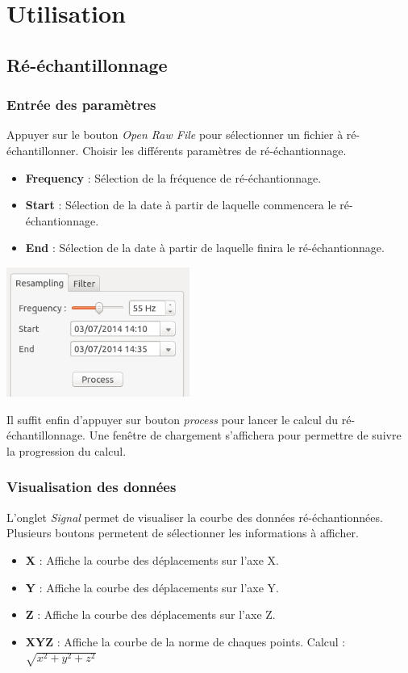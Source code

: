 \documentclass[a4paper,12pt]{article}
\begin{document}
\section{Utilisation}
\subsection{Ré-échantillonnage}
\subsubsection{Entrée des paramètres}
Appuyer sur le bouton \emph{Open Raw File} pour sélectionner un fichier à ré-échantillonner.
Choisir les différents paramètres de ré-échantionnage.
\begin{itemize}
 \item \textbf{Frequency} : Sélection de la fréquence de ré-échantionnage.
 \item \textbf{Start} : Sélection de la date à partir de laquelle commencera le ré-échantionnage.
 \item \textbf{End} : Sélection de la date à partir de laquelle finira le ré-échantionnage.
\end{itemize}
\begin{center}
 \includegraphics[width=6cm]{img/param_resampling.png}
\end{center}
Il suffit enfin d'appuyer sur bouton \emph{process} pour lancer le calcul du ré-échantillonnage. Une fenêtre de chargement s'affichera 
pour permettre de suivre la progression du calcul.


\subsubsection{Visualisation des données}
L'onglet \emph{Signal} permet de visualiser la courbe des données ré-échantionnées.
Plusieurs boutons permetent de sélectionner les informations à afficher.
\begin{itemize}
  \item \textbf{X} : Affiche la courbe des déplacements sur l'axe X.
  \item \textbf{Y} : Affiche la courbe des déplacements sur l'axe Y.
  \item \textbf{Z} : Affiche la courbe des déplacements sur l'axe Z.
  \item \textbf{XYZ} : Affiche la courbe de la norme de chaques points. Calcul : $\sqrt{x^2 + y^2 + z^2}$
\end{itemize}
\end{document}
